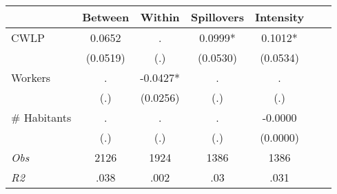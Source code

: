 \begin{tabular}{l*{6}{c}}\hline&\multicolumn{1}{c}{Between}&\multicolumn{1}{c}{Within}&\multicolumn{1}{c}{Spillovers}&\multicolumn{1}{c}{Intensity}\\ \hline 
CWLP & 0.0652 & . & 0.0999* & 0.1012* \\
 & (0.0519) & (.) & (0.0530) & (0.0534) \\
Workers & . & -0.0427* & . & . \\
 & (.) & (0.0256) & (.) & (.) \\
\# Habitants & . & . & . & -0.0000 \\
  & (.) & (.) & (.) & (0.0000) \\
\hline \textit{Obs} & 2126 & 1924 & 1386 & 1386  \\ \textit{R2} & .038 & .002 & .03 & .031 \\ \hline \end{tabular}

